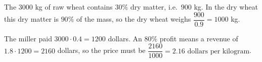 The $3000$ kg of raw wheat contains $30\%$ dry matter, i.e.\ $900$ kg. In the dry wheat this dry matter is $90\%$ of the mass, so the dry wheat weighs $\dfrac{900}{0.9}=1000$ kg.

The miller paid $3000\cdot0.4=1200$ dollars. An $80\%$ profit means a revenue of $1.8\cdot1200=2160$ dollars, so the price must be $\dfrac{2160}{1000}=\boxed{2.16\text{ dollars per kilogram}}$.
